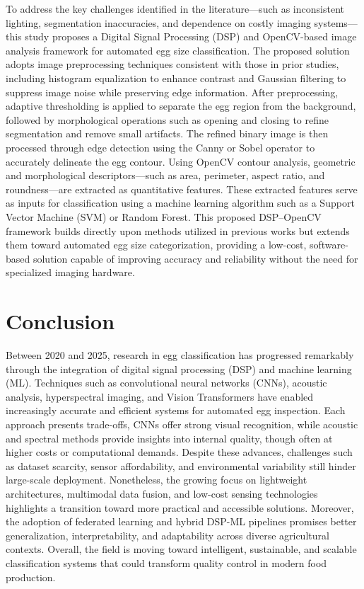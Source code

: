 \documentclass[conference]{IEEEtran}
\begin{document}
	To address the key challenges identified in the literature—such as inconsistent lighting, segmentation inaccuracies, and dependence on costly imaging systems—this study proposes a Digital Signal Processing (DSP) and OpenCV-based image analysis framework for automated egg size classification. The proposed solution adopts image preprocessing techniques consistent with those in prior studies, including histogram equalization to enhance contrast and Gaussian filtering to suppress image noise while preserving edge information. After preprocessing, adaptive thresholding is applied to separate the egg region from the background, followed by morphological operations such as opening and closing to refine segmentation and remove small artifacts. The refined binary image is then processed through edge detection using the Canny or Sobel operator to accurately delineate the egg contour. Using OpenCV contour analysis, geometric and morphological descriptors—such as area, perimeter, aspect ratio, and roundness—are extracted as quantitative features. These extracted features serve as inputs for classification using a machine learning algorithm such as a Support Vector Machine (SVM) or Random Forest. This proposed DSP–OpenCV framework builds directly upon methods utilized in previous works but extends them toward automated egg size categorization, providing a low-cost, software-based solution capable of improving accuracy and reliability without the need for specialized imaging hardware.
	
	\section{Conclusion}
	Between 2020 and 2025, research in egg classification has progressed remarkably through the integration of digital signal processing (DSP) and machine learning (ML). Techniques such as convolutional neural networks (CNNs), acoustic analysis, hyperspectral imaging, and Vision Transformers have enabled increasingly accurate and efficient systems for automated egg inspection. Each approach presents trade-offs, CNNs offer strong visual recognition, while acoustic and spectral methods provide insights into internal quality, though often at higher costs or computational demands. Despite these advances, challenges such as dataset scarcity, sensor affordability, and environmental variability still hinder large-scale deployment. Nonetheless, the growing focus on lightweight architectures, multimodal data fusion, and low-cost sensing technologies highlights a transition toward more practical and accessible solutions. Moreover, the adoption of federated learning and hybrid DSP-ML pipelines promises better generalization, interpretability, and adaptability across diverse agricultural contexts. Overall, the field is moving toward intelligent, sustainable, and scalable classification systems that could transform quality control in modern food production.
	
\end{document}
